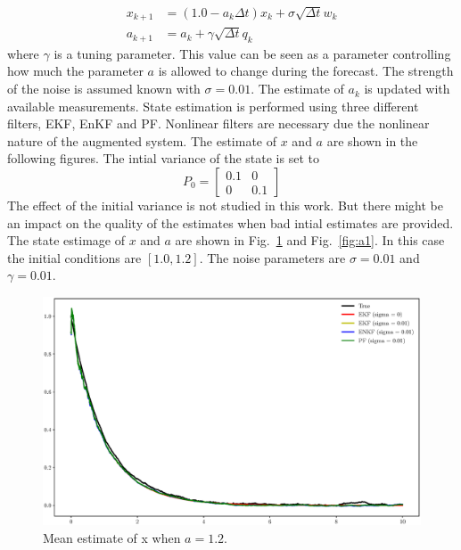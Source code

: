 \documentclass[]{elsarticle}
\begin{document}
\begin{align}
x_{k+1} &= (1.0 - a_k \Delta t) x_k + \sigma \sqrt{\Delta t} w_k \\ 
a_{k+1} &= a_k + \gamma \sqrt{\Delta t} q_k
\end{align}
where $\gamma$ is a tuning parameter. This value can be seen as a parameter controlling how much the parameter $a$ is allowed to change during the forecast. The strength of the noise is assumed known with $\sigma = 0.01$. The estimate of $a_k$ is updated with available measurements. State estimation is performed using three different filters, EKF, EnKF and PF. Nonlinear filters are necessary due the nonlinear nature of the augmented system. The estimate of $x$ and $a$ are shown in the following figures. The intial variance of the state is set to 
\begin{equation}
P_0 = \begin{bmatrix}
0.1 & 0 \\
0 & 0.1
\end{bmatrix}
\end{equation}
The effect of the initial variance is not studied in this work. But there might be an impact on the quality of the estimates when bad intial estimates are provided.
The state estimage of $x$ and $a$ are shown in Fig.~\ref{fig:x1} and Fig.~\ref{fig:a1}. In this case the initial conditions are $[1.0, 1.2]$. The noise parameters are $\sigma = 0.01$ and $\gamma = 0.01$.

\begin{figure}[!hptb]
\centering
\includegraphics[width=\linewidth,keepaspectratio]{./figs/case00_x_estimate.eps}
\caption{Mean estimate of x when $a=1.2$.}
\label{fig:x1}
\end{figure}
\end{document}
